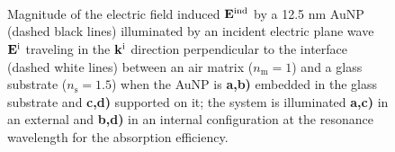 \begin{figure}[t!]\centering
   \def\svgwidth{.75 \textwidth}
   \footnotesize
   \\[-32.6em]
   \hspace*{-.25\textwidth}
       \begin{subfigure}{.25\textwidth}\caption{ } \label{sfig:Near:EE}\end{subfigure}%
       \begin{subfigure}{.36\textwidth}\caption{ } \label{sfig:Near:EI}\end{subfigure}\\[13em]
   \hspace*{-.25\textwidth}
       \begin{subfigure}{.25\textwidth}\caption{ } \label{sfig:Near:SE}\end{subfigure}%
       \begin{subfigure}{.36\textwidth}\caption{ } \label{sfig:Near:SI}\end{subfigure}\\[15em]
   \caption[Induced Electric Field of a 12.5 nm Au Spherical NP embbeded into (supported on) a substrate illuminated at a normal incidence]{Magnitude of the electric field induced $\vb{E}^\text{ind}$ by a 12.5 nm AuNP   (dashed black lines) illuminated by an incident electric plane wave $\vb{E}^\text{i}$ traveling in the $\vb{k}^\text{i}$ direction perpendicular to the interface  (dashed white lines) between an air matrix ($n_\text{m} = 1$) and a glass substrate ($n_\text{s} = 1.5$) when the AuNP is  \textbf{a,b)} embedded in the glass substrate and \textbf{c,d)} supported on it; the system is illuminated \textbf{a,c)}  in an external and \textbf{b,d)} in an internal configuration at the resonance wavelength for the absorption efficiency.}
   \label{fig:Near:IntExt}
 \end{figure}

